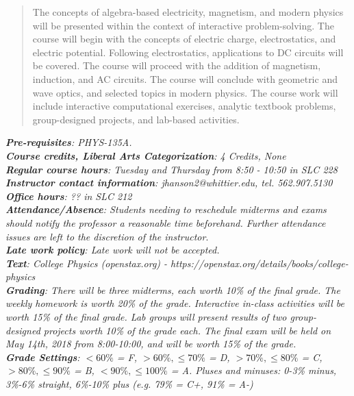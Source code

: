 \documentclass[10pt]{article}
\begin{document}
\maketitle

\begin{abstract}
The concepts of algebra-based electricity, magnetism, and modern physics will be presented within the context of interactive problem-solving.  The course will begin with the concepts of electric charge, electrostatics, and electric potential.  Following electrostatics, applications to DC circuits will be covered.  The course will proceed with the addition of magnetism, induction, and AC circuits.  The course will conclude with geometric and wave optics, and selected topics in modern physics.  The course work will include interactive computational exercises, analytic textbook problems, group-designed projects, and lab-based activities.
\end{abstract}
\noindent
\textit{\textbf{Pre-requisites}: PHYS-135A.} \\
\textit{\textbf{Course credits, Liberal Arts Categorization}: 4 Credits, None} \\
\textit{\textbf{Regular course hours}: Tuesday and Thursday from 8:50 - 10:50 in SLC 228} \\
\textit{\textbf{Instructor contact information}: jhanson2@whittier.edu, tel. 562.907.5130} \\
\textit{\textbf{Office hours}: ?? in SLC 212} \\
\textit{\textbf{Attendance/Absence}: Students needing to reschedule midterms and exams should notify the professor a reasonable time beforehand. Further attendance issues are left to the discretion of the instructor}.\\ 
\textit{\textbf{Late work policy}: Late work will not be accepted.} \\
\textit{\textbf{Text}: College Physics (openstax.org) -  https://openstax.org/details/books/college-physics} \\
\textit{\textbf{Grading}: There will be three midterms, each worth 10\% of the final grade.  The weekly homework is worth 20\% of the grade.  Interactive in-class activities will be worth 15\% of the final grade.  Lab groups will present results of two group-designed projects worth 10\% of the grade each.  The final exam will be held on May 14th, 2018 from 8:00-10:00, and will be worth 15\% of the grade.} \\
\textit{\textbf{Grade Settings}: $<60\%$ = F, $>60\%,\leq 70\%$ = D, $>70\%,\leq80\%$ = C, $>80\%,\leq 90\%$ = B, $<90\%,\leq 100\%$ = A.  Pluses and minuses: 0-3\% minus, 3\%-6\% straight, 6\%-10\% plus (e.g. 79\% = C+, 91\% = A-)} \\
\end{document}
